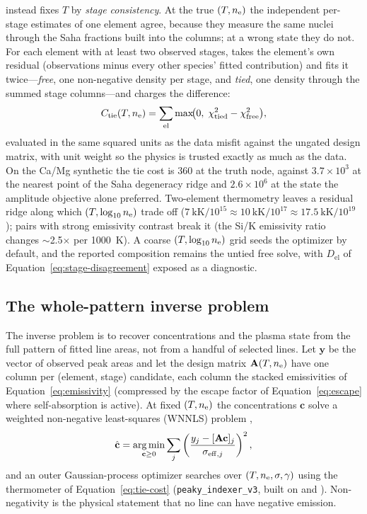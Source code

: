 \alibz{} instead fixes $T$ by \emph{stage consistency}. At the true $(T,n_{\mathrm{e}})$ the
independent per-stage estimates of one element agree, because they measure the same
nuclei through the Saha fractions built into the columns; at a wrong state they do
not. For each element with at least two observed stages, \alibz{} takes the element's
own residual (observations minus every other species' fitted contribution) and fits
it twice---\emph{free}, one non-negative density per stage, and \emph{tied}, one
density through the summed stage columns---and charges the difference:
%
\begin{equation}
  \label{eq:tie-cost}
  C_\mathrm{tie}(T,n_{\mathrm{e}}) =
    \sum_\mathrm{el}\max\!\bigl(0,\;
      \chi^2_\mathrm{tied} - \chi^2_\mathrm{free}\bigr),
\end{equation}
%
evaluated in the same squared units as the data misfit against the ungated design
matrix, with unit weight so the physics is trusted exactly as much as the data. On
the Ca/Mg synthetic the tie cost is $360$ at the truth node, against
$3.7\times10^3$ at the nearest point of the Saha degeneracy ridge and $2.6\times10^6$
at the state the amplitude objective alone preferred. Two-element thermometry leaves
a residual ridge along which $(T,\log_{10}n_{\mathrm{e}})$ trade off
($\SI{7}{\kilo\kelvin}/10^{15} \approx \SI{10}{\kilo\kelvin}/10^{17}
\approx \SI{17.5}{\kilo\kelvin}/10^{19}$); pairs with strong emissivity contrast
break it (the Si/K emissivity ratio changes $\sim$\num{2.5}$\times$ per
\SI{1000}{\kelvin}). A coarse $(T,\log_{10}n_{\mathrm{e}})$ grid seeds the optimizer by default,
and the reported composition remains the untied free solve, with $D_\mathrm{el}$ of
Equation~\eqref{eq:stage-disagreement} exposed as a diagnostic.

\subsection{The whole-pattern inverse problem}
\label{sec:theory-inverse}

The inverse problem is to recover concentrations and the plasma state from the full
pattern of fitted line areas, not from a handful of selected lines. Let
$\mathbf{y}$ be the vector of observed peak areas and let the design matrix
$\mathbf{A}(T,n_{\mathrm{e}})$ have one column per (element, stage) candidate, each column the
stacked emissivities of Equation~\eqref{eq:emissivity} (compressed by the escape
factor of Equation~\eqref{eq:escape} where self-absorption is active). At fixed
$(T,n_{\mathrm{e}})$ the concentrations $\mathbf{c}$ solve a weighted non-negative least-squares
(WNNLS) problem \citep{lawson1995nnls,bro1997nnls},
%
\begin{equation}
  \label{eq:wnnls}
  \hat{\mathbf{c}} = \operatorname*{arg\,min}_{\mathbf{c}\ge 0}
    \sum_j \left(\frac{y_j - [\mathbf{A}\mathbf{c}]_j}{\sigma_{\mathrm{eff},j}}\right)^2,
\end{equation}
%
and an outer Gaussian-process optimizer \citep{jones1998ego} searches over
$(T,n_{\mathrm{e}},\sigma,\gamma)$ using the thermometer of Equation~\eqref{eq:tie-cost} (\texttt{peaky\_indexer\_v3}, built on
\citealp{harris2020numpy} and \citealp{virtanen2020scipy}). Non-negativity is the
physical statement that no line can have negative emission.

